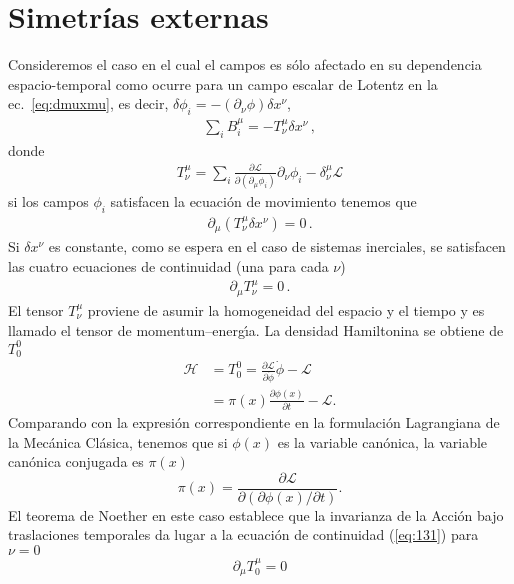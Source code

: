 \section{Simetrías externas}
Consideremos el caso en el cual el campos es sólo afectado en su dependencia espacio-temporal como ocurre para un campo escalar de Lotentz en la ec.~\eqref{eq:dmuxmu}, es decir,
 $\delta\phi_{i}=-\left( \partial_{\nu}\phi \right)\delta x^{\nu}$,
\begin{align}
   \sum_i    B^{\mu}_i= - T^{\mu}_{\nu} \delta x^{\nu}\,,
\end{align}
donde
\begin{align}
  T^{\mu}_{\nu}=\sum_i \frac{\partial\mathcal{L}}{\partial(\partial_{\mu}\phi_i)}\partial_{\nu}\phi_i-\delta^{\mu}_{\nu}\mathcal{L}
\end{align}
si los campos $\phi_{i}$ satisfacen la ecuación de movimiento tenemos que
\begin{align}
  \partial_{\mu} \left( T^{\mu}_{\nu} \delta x^{\nu}\right)=0\,.
\end{align}
Si $\delta x^{\nu}$ es constante, como se espera en el caso de sistemas inerciales, se satisfacen las cuatro  ecuaciones de continuidad (una para cada $\nu$)
\begin{align}
  \partial_{\mu} T^{\mu}_{\nu}=0\,.
\end{align}
El tensor $T^\mu_\nu$ proviene de asumir la homogeneidad del espacio y el tiempo y es llamado el tensor de momentum--energ\'\i a. 
La densidad Hamiltonina se obtiene de $T^0_0$
\begin{align}
  \label{eq:3}
\mathcal{H}&=T^0_0=\frac{\partial\mathcal{L}}{\partial\dot{\phi}}\dot{\phi}
      -\mathcal{L}\\
      &=\pi(x)\frac{\partial\phi(x)}{\partial t}-\mathcal{L}.
\end{align}
Comparando con la expresi\'on correspondiente en la formulaci\'on
Lagrangiana de la Mec\'anica Cl\'asica, tenemos que si $\phi(x)$ es la
variable can\'onica, la variable can\'onica conjugada es $\pi(x)$
\begin{equation}
  \label{eq:4}
  \pi(x)=\frac{\partial\mathcal{L}}{\partial(\partial\phi(x)/\partial t)}.
\end{equation}
El teorema de Noether en este caso establece que la invarianza de la Acci\'on bajo traslaciones temporales da lugar a la ecuaci\'on de continuidad (\ref{eq:131}) para $\nu=0$
\begin{align}
\label{eq:122}
  \partial_\mu T^\mu_0=0
\end{align}
